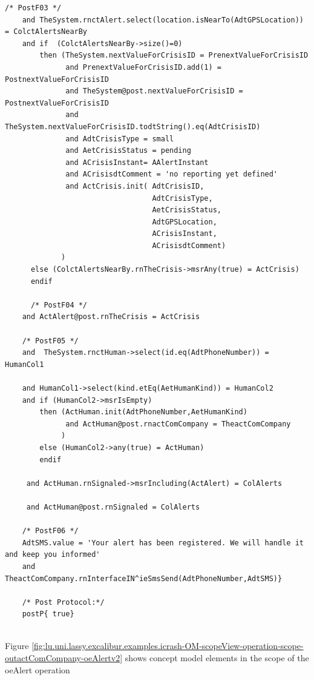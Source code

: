 \begin{lstlisting}[style=MessirStyle,firstnumber=auto,captionpos=b,caption={\msrmessir (MCL-oriented) specification of the operation \emph{oeAlert}.},label=OM-actComCompany-oeAlert-MCL-LST]
	  /* PostF03 */
	and TheSystem.rnctAlert.select(location.isNearTo(AdtGPSLocation)) = ColctAlertsNearBy
	and if  (ColctAlertsNearBy->size()=0)
	    then (TheSystem.nextValueForCrisisID = PrenextValueForCrisisID
	          and PrenextValueForCrisisID.add(1) = PostnextValueForCrisisID
	          and TheSystem@post.nextValueForCrisisID = PostnextValueForCrisisID
	          and TheSystem.nextValueForCrisisID.todtString().eq(AdtCrisisID)
	          and AdtCrisisType = small
	          and AetCrisisStatus = pending
	          and ACrisisInstant= AAlertInstant
	          and ACrisisdtComment = 'no reporting yet defined'
	          and ActCrisis.init( AdtCrisisID,
	                              AdtCrisisType,
	                              AetCrisisStatus,
	                              AdtGPSLocation,
	                              ACrisisInstant,
	                              ACrisisdtComment)
	         )
	  else (ColctAlertsNearBy.rnTheCrisis->msrAny(true) = ActCrisis)
	  endif
	
	  /* PostF04 */
	and ActAlert@post.rnTheCrisis = ActCrisis
	      
	/* PostF05 */
	and  TheSystem.rnctHuman->select(id.eq(AdtPhoneNumber)) = HumanCol1
	
	and HumanCol1->select(kind.etEq(AetHumanKind)) = HumanCol2
	and if (HumanCol2->msrIsEmpty)
	    then (ActHuman.init(AdtPhoneNumber,AetHumanKind)
	          and ActHuman@post.rnactComCompany = TheactComCompany
	         )
	    else (HumanCol2->any(true) = ActHuman)
	    endif
	    
	 and ActHuman.rnSignaled->msrIncluding(ActAlert) = ColAlerts
	 
	 and ActHuman@post.rnSignaled = ColAlerts
	
	/* PostF06 */
	AdtSMS.value = 'Your alert has been registered. We will handle it and keep you informed'
	and TheactComCompany.rnInterfaceIN^ieSmsSend(AdtPhoneNumber,AdtSMS)}
	
	/* Post Protocol:*/ 
	postP{ true}
	
	\end{lstlisting}
	\normalsize 
	
	
	
	





Figure \ref{fig:lu.uni.lassy.excalibur.examples.icrash-OM-scopeView-operation-scope-outactComCompany-oeAlertv2}
shows concept model elements in the scope of the oeAlert operation

